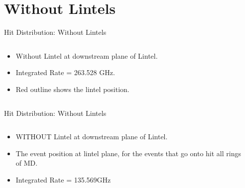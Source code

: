 \documentclass[aspectratio=1610]{beamer}
\begin{document}
\section{Without Lintels}
%
%
\begin{frame}{Hit Distribution: Without Lintels}
    \begin{columns}
        \begin{column}{0.39\textwidth}
            \begin{itemize}
                \item Without Lintel at downstream plane of Lintel.
                \item Integrated Rate = 263.528 GHz.
                \item Red outline shows the lintel position.
            \end{itemize}
        \end{column}
        \begin{column}{0.59\textwidth}
        \end{column}
    \end{columns}
\end{frame}
%
%
%
%
%
\begin{frame}{Hit Distribution: Without Lintels}
    \begin{columns}
        \begin{column}{0.39\textwidth}
            \begin{itemize}
                \item WITHOUT Lintel at downstream plane of Lintel.
                \item The event position at lintel plane, for the events that go onto hit all rings of MD.
                \item Integrated Rate = 135.569GHz
            \end{itemize}
        \end{column}
        \begin{column}{0.59\textwidth}
        \end{column}
    \end{columns}
\end{frame}
%
%
%
%
%
\end{document}
